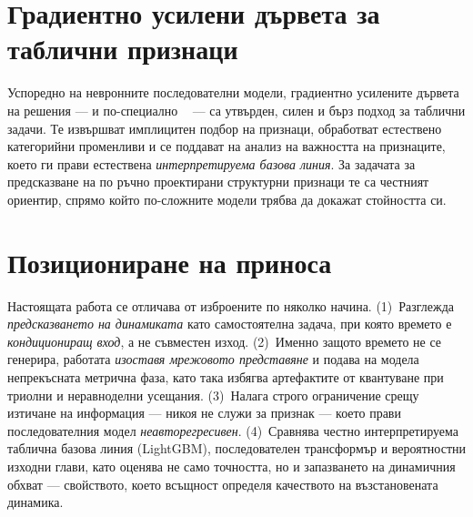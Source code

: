 \section{Градиентно усилени дървета за таблични признаци}
\label{sec:svarzani-lgbm}

Успоредно на невронните последователни модели, градиентно усилените дървета на
решения — и по-специално ~\cite{ke2017lightgbm} — са утвърден,
силен и бърз подход за таблични задачи. Те извършват имплицитен подбор на
признаци, обработват естествено категорийни променливи и се поддават на анализ на
важността на признаците, което ги прави естествена \emph{интерпретируема базова
линия}. За задачата за предсказване на  по ръчно проектирани
структурни признаци те са честният ориентир, спрямо който по-сложните модели
трябва да докажат стойността си.

\section{Позициониране на приноса}
\label{sec:svarzani-prinos}

Настоящата работа се отличава от изброените по няколко начина. (1)~Разглежда
\emph{предсказването на динамиката} като самостоятелна задача, при която времето
е \emph{кондициониращ вход}, а не съвместен изход. (2)~Именно защото времето не
се генерира, работата \emph{изоставя мрежовото представяне} и подава на модела
непрекъсната метрична фаза, като така избягва артефактите от квантуване при
триолни и неравноделни усещания. (3)~Налага строго ограничение срещу изтичане на
информация — никоя  не служи за признак — което прави
последователния модел \emph{неавторегресивен}. (4)~Сравнява честно интерпретируема
таблична базова линия (LightGBM), последователен трансформър и вероятностни
изходни глави, като оценява не само точността, но и запазването на динамичния
обхват — свойството, което всъщност определя качеството на възстановената
динамика.
